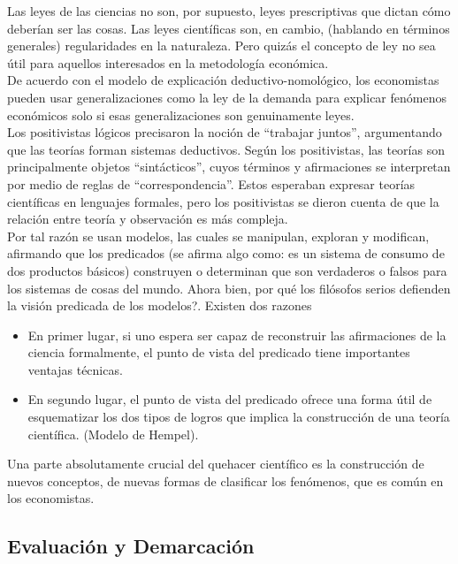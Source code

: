 Las leyes de las ciencias no son, por supuesto, leyes prescriptivas que dictan cómo deberían ser las cosas. Las leyes científicas son, en cambio, (hablando en términos generales) regularidades en la naturaleza. Pero quizás el concepto de ley no sea útil para aquellos interesados en la metodología económica.\\

De acuerdo con el modelo de explicación deductivo-nomológico, los economistas pueden usar generalizaciones como la ley de la demanda para explicar fenómenos económicos solo si esas generalizaciones son genuinamente leyes.\\

Los positivistas lógicos precisaron la noción de “trabajar juntos”, argumentando que las teorías forman sistemas deductivos. Según los positivistas, las teorías son principalmente objetos “sintácticos”, cuyos términos y afirmaciones se interpretan por medio de reglas de “correspondencia”. Estos esperaban expresar teorías científicas en lenguajes formales, pero los positivistas se dieron cuenta de que la relación entre teoría y observación es más compleja.\\

Por tal razón se usan modelos, las cuales se manipulan, exploran y modifican, afirmando que los predicados (se afirma algo como: es un sistema de consumo de dos productos básicos) construyen o determinan que son verdaderos o falsos para los sistemas de cosas del mundo. Ahora bien, por qué los filósofos serios defienden la visión predicada de los modelos?.
Existen dos razones

\begin{itemize}
    \item En primer lugar, si uno espera ser capaz de reconstruir las afirmaciones de la ciencia formalmente, el punto de vista del predicado tiene importantes ventajas técnicas.
    \item En segundo lugar, el punto de vista del predicado ofrece una forma útil de esquematizar los dos tipos de logros que implica la construcción de una teoría científica. (Modelo de Hempel).
\end{itemize}

Una parte absolutamente crucial del quehacer científico es la construcción de nuevos conceptos, de nuevas formas de clasificar los fenómenos, que es común en los economistas.

\subsection{Evaluación y Demarcación}

